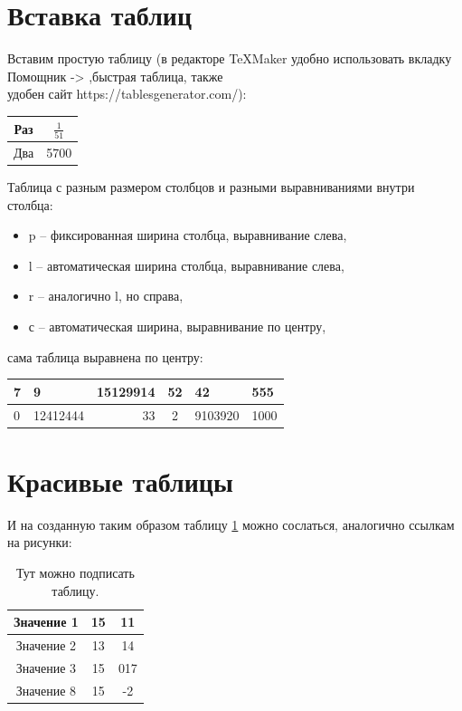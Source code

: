 \documentclass[a4paper, 12pt]{article}
\begin{document}
\section{Вставка таблиц}

Вставим простую таблицу (в редакторе TeXMaker удобно использовать вкладку Помощник -> ,быстрая таблица, также \\ удобен сайт https://tablesgenerator.com/):

\begin{tabular}{|c|c|}
\hline 
Раз & $\frac{1}{51}$ \\  \hline 
Два & 5700 \\  \hline 
\end{tabular} 

Таблица с разным размером столбцов и разными выравниваниями внутри столбца:
\begin{itemize}
	\item p -- фиксированная ширина столбца, выравнивание слева,
	\item l -- автоматическая ширина столбца, выравнивание слева,
	\item r -- аналогично l, но справа,
	\item с -- автоматическая ширина, выравнивание по центру,
\end{itemize}
сама таблица выравнена по центру:
\begin{center}
\begin{tabular}{|p{2cm}|l|r|c|p{90pt}|p{}|}
\hline 
7 & 9 & 15129914 & 52 & 42 & 555 \\ 
\hline 
0 & 12412444 & 33 & 2 & 9103920 & 1000 \\ 
\hline 
\end{tabular} 
\end{center}

\section{Красивые таблицы}
И на созданную таким образом таблицу \ref{our_table} можно сослаться, аналогично ссылкам на рисунки:

\begin{table}[h!]
    \centering
    \caption{Тут можно подписать таблицу.}\label{our_table}
	\begin{tabular}{|c|c|c|}
 \hline
 Значение 1 & 15 & 11 \\ \hline
 Значение 2 & 13 & 14\\ \hline
 Значение 3 & 15 & 017 \\ \hline
 Значение 8 & 15 & -2 \\ \hline
	\end{tabular}
\end{table}
\end{document}
